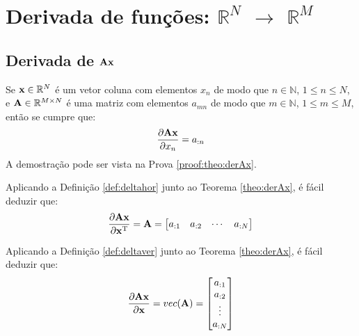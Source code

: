 
\chapter{Derivada de funções: $\mathbb{R}^{N}$ $\rightarrow$ $\mathbb{R}^{M}$}


\section{Derivada de $\MATRIX{A}\VECTOR{x}$}

\begin{theorem}\label{theo:derAx}
Se 
$\VECTOR{x}\in \mathbb{R}^N$ é um vetor coluna com elementos $x_n$ de modo que
$n\in \mathbb{N}$, $1 \leq n \leq N$, e 
$\MATRIX{A} \in \mathbb{R}^{M\times N}$ é uma matriz com elementos $a_{mn}$ de modo que
$m\in \mathbb{N}$, $1 \leq m \leq M$, então se cumpre que:
\begin{equation}
\frac{\partial \MATRIX{A}\VECTOR{x}}{\partial x_n}=a_{:n}
\end{equation}
A demostração pode ser vista na Prova \ref{proof:theo:derAx}.
\end{theorem}

\begin{corollaryT}\label{coro:derAx1}
Aplicando a Definição \ref{def:deltahor} junto ao Teorema \ref{theo:derAx}, é
fácil deduzir que:
\begin{equation}
\frac{\partial \MATRIX{A}\VECTOR{x}}{\partial \VECTOR{x}^{\transpose}}=
\MATRIX{A}=
\left[
\begin{matrix}
 a_{:1} &  a_{:2} &  \cdots &  a_{:N}
\end{matrix}
\right]
\end{equation}
\end{corollaryT}

\begin{corollaryT}\label{coro:derAx2}
Aplicando a Definição \ref{def:deltaver} junto ao Teorema \ref{theo:derAx}, é
fácil deduzir que:
\begin{equation}
\frac{\partial \MATRIX{A}\VECTOR{x}}{\partial \VECTOR{x}}=\funcvec(\MATRIX{A})=
\left[
\begin{matrix}
 a_{:1} \\  a_{:2} \\  \vdots \\  a_{:N}
\end{matrix}
\right]
\end{equation}
\end{corollaryT}

